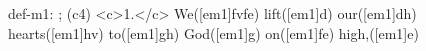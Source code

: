 def-m1: \grealign;
(c4) <c>1.</c> We([em1]fvfe) lift([em1]d) our([em1]dh) hearts([em1]hv) to([em1]gh) God([em1]g) on([em1]fe) high,([em1]e)